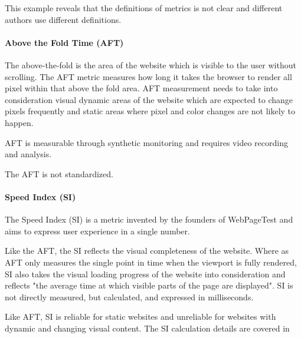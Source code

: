 This example reveals that the definitions of metrics is not clear and different authors use different definitions.







\paragraph{Above the Fold Time (AFT)}

The above-the-fold is the area of the website which is visible to the user without scrolling.
The AFT metric measures how long it takes the browser to render all pixel within that above the fold area.
AFT measurement needs to take into consideration visual dynamic areas of the website which are expected to change pixels frequently and static areas where pixel and color changes are not likely to happen. %

AFT is measurable through synthetic monitoring and requires video recording and analysis. %

The AFT is not standardized. %





\paragraph{Speed Index (SI)}

The Speed Index (SI) is a metric invented by the founders of WebPageTest and aims to express user experience in a single number. %

Like the AFT, the SI reflects the visual completeness of the website.
Where as AFT only measures the single point in time when the viewport is fully rendered, SI also takes the visual loading progress of the website into consideration and reflects "the average time at which visible parts of the page are displayed". %
SI is not directly measured, but calculated, and expressed in milliseconds. %

Like AFT, SI is reliable for static websites and unreliable for websites with dynamic and changing visual content. %
The SI calculation details are covered in %




